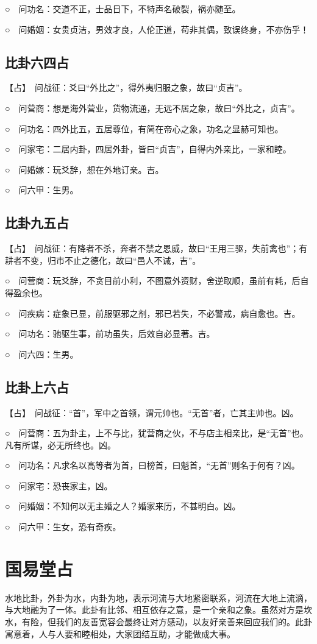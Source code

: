 \documentclass[12pt,oneside]{book}
\begin{document}
○　问功名：交道不正，士品日下，不特声名破裂，祸亦随至。

○　问婚姻：女贵贞洁，男效才良，人伦正道，苟非其偶，致误终身，不亦伤乎！
\subsection{比卦六四占}
【占】　问战征：爻曰“外比之”，得外夷归服之象，故曰“贞吉”。

○　问营商：想是海外营业，货物流通，无远不居之象，故曰“外比之，贞吉”。

○　问功名：四外比五，五居尊位，有简在帝心之象，功名之显赫可知也。

○　问家宅：二居内卦，四居外卦，皆曰“贞吉”，自得内外亲比，一家和睦。

○　问婚嫁：玩爻辞，想在外地订亲。吉。

○　问六甲：生男。
\subsection{比卦九五占}
【占】　问战征：有降者不杀，奔者不禁之恩威，故曰“王用三驱，失前禽也”；有耕者不变，归市不止之德化，故曰“邑人不诫，吉”。

○　问营商：玩爻辞，不贪目前小利，不图意外资财，舍逆取顺，虽前有耗，后自得盈余也。

○　问疾病：症象已显，前服驱邪之剂，邪已若失，不必警戒，病自愈也。吉。

○　问功名：驰驱生事，前功虽失，后效自必显著。吉。

○　问六四：生男。
\subsection{比卦上六占}
【占】　问战征：“首”，军中之首领，谓元帅也。“无首”者，亡其主帅也。凶。

○　问营商：五为卦主，上不与比，犹营商之伙，不与店主相亲比，是“无首”也。凡有所谋，必无所终也。凶。

○　问功名：凡求名以高等者为首，曰榜首，曰魁首，“无首”则名于何有？凶。

○　问家宅：恐丧家主，凶。

○　问婚姻：不知何以无主婚之人？婚家来历，不甚明白。凶。

○　问六甲：生女，恐有奇疾。

\section{国易堂占}
水地比卦，外卦为水，内卦为地，表示河流与大地紧密联系，河流在大地上流滴，与大地融为了一体。此卦有比邻、相互依存之意，是一个亲和之象。虽然对方是坎水，有险，但我们的友善宽容会最终让对方感动，以友好亲善来回应我们的。此卦寓意着，人与人要和睦相处，大家团结互助，才能做成大事。
\end{document}
